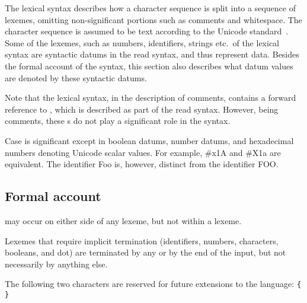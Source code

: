 The lexical syntax describes how a character sequence is split into a
sequence of lexemes, omitting non-significant portions
such as comments and whitespace.  The character sequence is assumed to
be text according to the Unicode standard~\cite{Unicode}.  Some of
the lexemes, such as numbers, identifiers, strings etc.\ of the lexical
syntax are syntactic datums in the read syntax, and thus represent data.
Besides the formal account of the syntax, this section also describes
what datum values are denoted by these syntactic datums.

Note that the lexical syntax, in the description of comments, contains
a forward reference to , which is described as part of the
read syntax.  However, being comments, these s do not play
a significant role in the syntax.

Case is significant except in boolean datums, number datums, and
hexadecimal numbers denoting Unicode scalar values.  For example, {\cf \#x1A}
and {\cf \#X1a} are equivalent.  The identifier {\cf Foo} is, however,
distinct from the identifier {\cf FOO}.

\subsection{Formal account}
\label{lexicalgrammarsection}

 may occur on either side of any lexeme, but not
within a lexeme.

\vest Lexemes that require implicit termination (identifiers, numbers,
characters, booleans, and dot) are terminated by any 
or by the end of the input, but not necessarily by anything else.

The following two characters are reserved for future extensions to the
language: {\tt \verb"{" \verb"}"}

